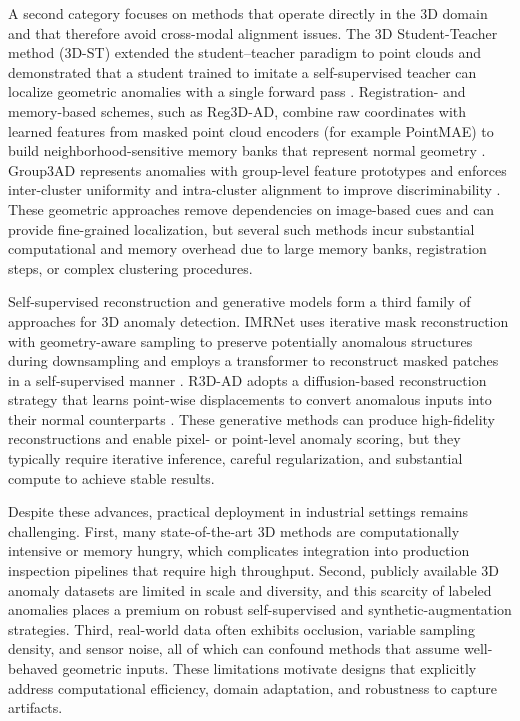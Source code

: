 A second category focuses on methods that operate directly in the 3D domain and that therefore avoid cross-modal alignment issues. The 3D Student-Teacher method (3D-ST) extended the student–teacher paradigm to point clouds and demonstrated that a student trained to imitate a self-supervised teacher can localize geometric anomalies with a single forward pass \cite{bergmann2023anomaly}. Registration- and memory-based schemes, such as Reg3D-AD, combine raw coordinates with learned features from masked point cloud encoders (for example PointMAE) to build neighborhood-sensitive memory banks that represent normal geometry \cite{liu2023real3d}. Group3AD represents anomalies with group-level feature prototypes and enforces inter-cluster uniformity and intra-cluster alignment to improve discriminability \cite{zhu2024towards}. These geometric approaches remove dependencies on image-based cues and can provide fine-grained localization, but several such methods incur substantial computational and memory overhead due to large memory banks, registration steps, or complex clustering procedures.

Self-supervised reconstruction and generative models form a third family of approaches for 3D anomaly detection. IMRNet uses iterative mask reconstruction with geometry-aware sampling to preserve potentially anomalous structures during downsampling and employs a transformer to reconstruct masked patches in a self-supervised manner \cite{li2024towards}. R3D-AD adopts a diffusion-based reconstruction strategy that learns point-wise displacements to convert anomalous inputs into their normal counterparts \cite{zhou2024r3d}. These generative methods can produce high-fidelity reconstructions and enable pixel- or point-level anomaly scoring, but they typically require iterative inference, careful regularization, and substantial compute to achieve stable results.

Despite these advances, practical deployment in industrial settings remains challenging. First, many state-of-the-art 3D methods are computationally intensive or memory hungry, which complicates integration into production inspection pipelines that require high throughput. Second, publicly available 3D anomaly datasets are limited in scale and diversity, and this scarcity of labeled anomalies places a premium on robust self-supervised and synthetic-augmentation strategies. Third, real-world data often exhibits occlusion, variable sampling density, and sensor noise, all of which can confound methods that assume well-behaved geometric inputs. These limitations motivate designs that explicitly address computational efficiency, domain adaptation, and robustness to capture artifacts.


